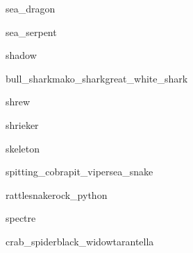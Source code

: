 \documentclass[a4paper,serif]{module}
\begin{document}
\begin{newmonster}{sea_dragon}\end{newmonster}

\begin{newmonster}{sea_serpent}\end{newmonster}

\begin{newmonster}{shadow}\end{newmonster}


\begin{newmonster3}{bull_shark}{mako_shark}{great_white_shark}\end{newmonster3}

\begin{newmonster}{shrew}\end{newmonster}

\begin{newmonster}{shrieker}\end{newmonster}

\begin{newmonster}{skeleton}\end{newmonster}


\begin{newmonster3}{spitting_cobra}{pit_viper}{sea_snake}\end{newmonster3}
\begin{newmonster2*}{rattlesnake}{rock_python}{}{}\end{newmonster2*}

\begin{newmonster}{spectre}\end{newmonster}


\begin{newmonster3}{crab_spider}{black_widow}{tarantella}\end{newmonster3}
\end{document}
